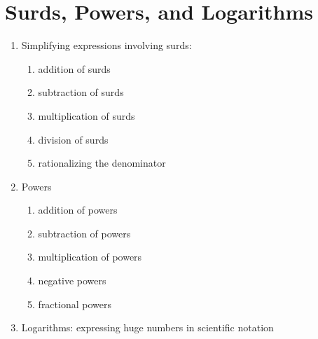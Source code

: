 
\chapter{Surds, Powers, and Logarithms}

\begin{enumerate}
\item Simplifying expressions involving surds:
  \begin{enumerate}
  \item addition of surds

  \item subtraction of surds

  \item multiplication of surds

  \item division of surds

  \item rationalizing the denominator
  \end{enumerate}

\item Powers
  \begin{enumerate}
  \item addition of powers

  \item subtraction of powers

  \item multiplication of powers

  \item negative powers

  \item fractional powers
  \end{enumerate}

\item Logarithms: expressing huge numbers in scientific notation
\end{enumerate}
